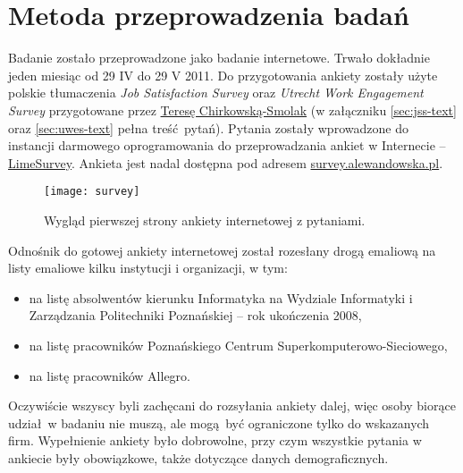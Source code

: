 \chapter{Metoda przeprowadzenia badań}
Badanie zostało przeprowadzone jako badanie internetowe. Trwało dokładnie jeden miesiąc od 29 IV do 29 V 2011. Do przygotowania ankiety zostały użyte polskie tłumaczenia \emph{Job Satisfaction Survey} oraz \emph{Utrecht Work Engagement Survey} przygotowane przez \href{http://www.psychologia.amu.edu.pl/ip-uam/struktura-zatrudnienia-w-instytucie/curriculum-vitae-teresa-chirkowska-smolak/}{Teresę Chirkowską-Smolak} (w załączniku \ref{sec:jss-text} oraz \ref{sec:uwes-text} pełna treść pytań). Pytania zostały wprowadzone do instancji darmowego oprogramowania do przeprowadzania ankiet
w Internecie -- \href{http://www.limesurvey.org/}{LimeSurvey}. Ankieta jest nadal dostępna pod
adresem \url{survey.alewandowska.pl}.

\begin{figure}[h]
\begin{center}
\texttt{[image: survey]}
\end{center}
\caption{Wygląd pierwszej strony ankiety internetowej z pytaniami.}
\label{fig:sex}
\end{figure}

Odnośnik do gotowej ankiety internetowej został rozesłany drogą emaliową na listy emaliowe kilku instytucji i organizacji, w tym:
\begin{itemize}
\item na listę absolwentów kierunku Informatyka na Wydziale Informatyki i Zarządzania Politechniki Poznańskiej -- rok ukończenia 2008,
\item na listę pracowników Poznańskiego Centrum Superkomputerowo-Sieciowego,
\item na listę pracowników Allegro.
\end{itemize}
Oczywiście wszyscy byli zachęcani do rozsyłania ankiety dalej, więc osoby biorące udział w badaniu nie muszą, ale mogą być ograniczone tylko do wskazanych firm. Wypełnienie ankiety było dobrowolne, przy czym wszystkie pytania w ankiecie były obowiązkowe, także dotyczące danych demograficznych.
